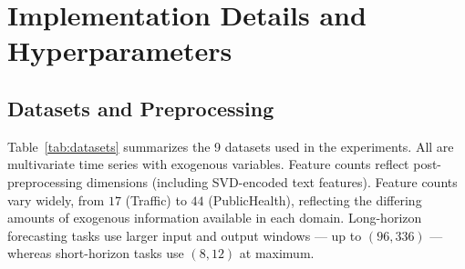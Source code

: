 \section{Implementation Details and Hyperparameters}
\label{app:implementation}

\subsection{Datasets and Preprocessing}

Table~\ref{tab:datasets} summarizes the 9 datasets used in the experiments. All are multivariate time series with exogenous variables. Feature counts reflect post-preprocessing dimensions (including SVD-encoded text features). Feature counts vary widely, from $17$ (Traffic) to $44$ (PublicHealth), reflecting the differing amounts of exogenous information available in each domain. Long-horizon forecasting tasks use larger input and output windows --- up to $(96, 336)$ --- whereas short-horizon tasks use $(8, 12)$ at maximum.

\begin{nolinenumbers}
\begin{table}[htbp]
\caption{Dataset statistics. Feature counts are post-preprocessing.}
\label{tab:datasets}
\centering
\small
\setlength{\tabcolsep}{3pt}
\end{table}
\end{nolinenumbers}

